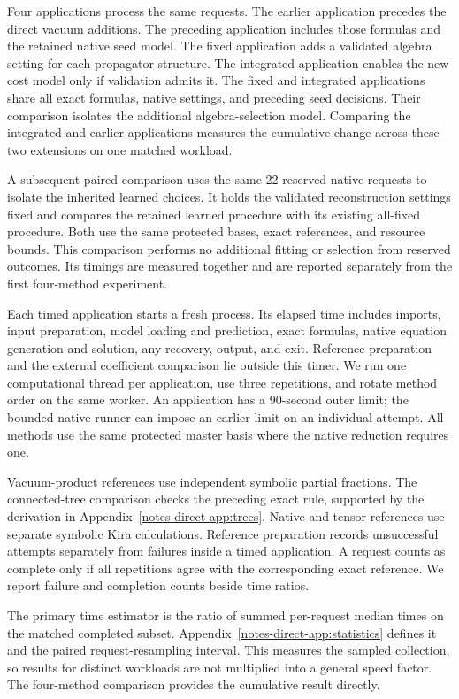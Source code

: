 \documentclass[11pt,a4paper]{article}
\begin{document}
Four applications process the same requests. The earlier application precedes the direct vacuum additions. The preceding application includes those formulas and the retained native seed model. The fixed application adds a validated algebra setting for each propagator structure. The integrated application enables the new cost model only if validation admits it. The fixed and integrated applications share all exact formulas, native settings, and preceding seed decisions. Their comparison isolates the additional algebra-selection model. Comparing the integrated and earlier applications measures the cumulative change across these two extensions on one matched workload.

A subsequent paired comparison uses the same 22 reserved native requests to isolate the inherited learned choices. It holds the validated reconstruction settings fixed and compares the retained learned procedure with its existing all-fixed procedure. Both use the same protected bases, exact references, and resource bounds. This comparison performs no additional fitting or selection from reserved outcomes. Its timings are measured together and are reported separately from the first four-method experiment.

Each timed application starts a fresh process. Its elapsed time includes imports, input preparation, model loading and prediction, exact formulas, native equation generation and solution, any recovery, output, and exit. Reference preparation and the external coefficient comparison lie outside this timer. We run one computational thread per application, use three repetitions, and rotate method order on the same worker. An application has a 90-second outer limit; the bounded native runner can impose an earlier limit on an individual attempt. All methods use the same protected master basis where the native reduction requires one.

Vacuum-product references use independent symbolic partial fractions. The connected-tree comparison checks the preceding exact rule, supported by the derivation in Appendix~\ref{notes-direct-app:trees}. Native and tensor references use separate symbolic Kira calculations. Reference preparation records unsuccessful attempts separately from failures inside a timed application. A request counts as complete only if all repetitions agree with the corresponding exact reference. We report failure and completion counts beside time ratios.

The primary time estimator is the ratio of summed per-request median times on the matched completed subset. Appendix~\ref{notes-direct-app:statistics} defines it and the paired request-resampling interval. This measures the sampled collection, so results for distinct workloads are not multiplied into a general speed factor. The four-method comparison provides the cumulative result directly.
\end{document}
